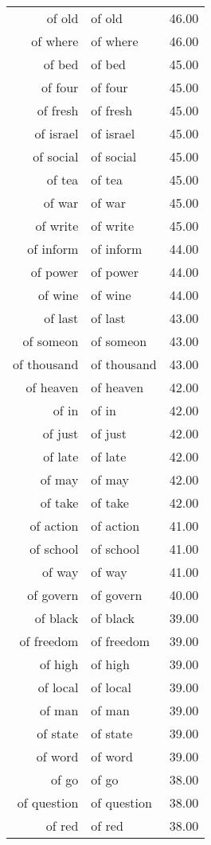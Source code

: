 \begin{table}[ht]
\begin{tabular}{rlr}
  of old & of old & 46.00 \\ 
  of where & of where & 46.00 \\ 
  of bed & of bed & 45.00 \\ 
  of four & of four & 45.00 \\ 
  of fresh & of fresh & 45.00 \\ 
  of israel & of israel & 45.00 \\ 
  of social & of social & 45.00 \\ 
  of tea & of tea & 45.00 \\ 
  of war & of war & 45.00 \\ 
  of write & of write & 45.00 \\ 
  of inform & of inform & 44.00 \\ 
  of power & of power & 44.00 \\ 
  of wine & of wine & 44.00 \\ 
  of last & of last & 43.00 \\ 
  of someon & of someon & 43.00 \\ 
  of thousand & of thousand & 43.00 \\ 
  of heaven & of heaven & 42.00 \\ 
  of in & of in & 42.00 \\ 
  of just & of just & 42.00 \\ 
  of late & of late & 42.00 \\ 
  of may & of may & 42.00 \\ 
  of take & of take & 42.00 \\ 
  of action & of action & 41.00 \\ 
  of school & of school & 41.00 \\ 
  of way & of way & 41.00 \\ 
  of govern & of govern & 40.00 \\ 
  of black & of black & 39.00 \\ 
  of freedom & of freedom & 39.00 \\ 
  of high & of high & 39.00 \\ 
  of local & of local & 39.00 \\ 
  of man & of man & 39.00 \\ 
  of state & of state & 39.00 \\ 
  of word & of word & 39.00 \\ 
  of go & of go & 38.00 \\ 
  of question & of question & 38.00 \\ 
  of red & of red & 38.00 \\ 

\end{tabular}
\end{table}
